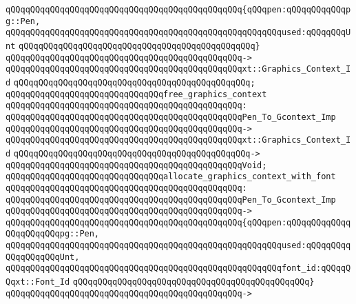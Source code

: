 \verb|qQQqqQQqqQQqqQQqqQQqqQQqqQQqqQQqqQQqqQQqqQQqqQQq{qQQqpen:qQQqqQQqqQQqpg::Pen,|\newline
\verb|qQQqqQQqqQQqqQQqqQQqqQQqqQQqqQQqqQQqqQQqqQQqqQQqqQQqqQQqused:qQQqqQQqUnt|\newline
\verb|qQQqqQQqqQQqqQQqqQQqqQQqqQQqqQQqqQQqqQQqqQQqqQQq}|\newline
\verb|qQQqqQQqqQQqqQQqqQQqqQQqqQQqqQQqqQQqqQQqqQQqqQQq->|\newline
\verb|qQQqqQQqqQQqqQQqqQQqqQQqqQQqqQQqqQQqqQQqqQQqqQQqxt::Graphics_Context_Id|\newline
\verb|qQQqqQQqqQQqqQQqqQQqqQQqqQQqqQQqqQQqqQQqqQQqqQQq;|\newline
\newline
\verb|qQQqqQQqqQQqqQQqqQQqqQQqqQQqqQQqfree_graphics_context|\newline
\verb|qQQqqQQqqQQqqQQqqQQqqQQqqQQqqQQqqQQqqQQqqQQqqQQq:|\newline
\verb|qQQqqQQqqQQqqQQqqQQqqQQqqQQqqQQqqQQqqQQqqQQqqQQqPen_To_Gcontext_Imp|\newline
\verb|qQQqqQQqqQQqqQQqqQQqqQQqqQQqqQQqqQQqqQQqqQQqqQQq->|\newline
\verb|qQQqqQQqqQQqqQQqqQQqqQQqqQQqqQQqqQQqqQQqqQQqqQQqxt::Graphics_Context_Id|\newline
\verb|qQQqqQQqqQQqqQQqqQQqqQQqqQQqqQQqqQQqqQQqqQQqqQQq->|\newline
\verb|qQQqqQQqqQQqqQQqqQQqqQQqqQQqqQQqqQQqqQQqqQQqqQQqVoid;|\newline
\newline
\verb|qQQqqQQqqQQqqQQqqQQqqQQqqQQqqQQqallocate_graphics_context_with_font|\newline
\verb|qQQqqQQqqQQqqQQqqQQqqQQqqQQqqQQqqQQqqQQqqQQqqQQq:|\newline
\verb|qQQqqQQqqQQqqQQqqQQqqQQqqQQqqQQqqQQqqQQqqQQqqQQqPen_To_Gcontext_Imp|\newline
\verb|qQQqqQQqqQQqqQQqqQQqqQQqqQQqqQQqqQQqqQQqqQQqqQQq->|\newline
\verb|qQQqqQQqqQQqqQQqqQQqqQQqqQQqqQQqqQQqqQQqqQQqqQQq{qQQqpen:qQQqqQQqqQQqqQQqqQQqqQQqpg::Pen,|\newline
\verb|qQQqqQQqqQQqqQQqqQQqqQQqqQQqqQQqqQQqqQQqqQQqqQQqqQQqqQQqused:qQQqqQQqqQQqqQQqqQQqUnt,|\newline
\verb|qQQqqQQqqQQqqQQqqQQqqQQqqQQqqQQqqQQqqQQqqQQqqQQqqQQqqQQqfont_id:qQQqqQQqxt::Font_Id|\newline
\verb|qQQqqQQqqQQqqQQqqQQqqQQqqQQqqQQqqQQqqQQqqQQqqQQq}|\newline
\verb|qQQqqQQqqQQqqQQqqQQqqQQqqQQqqQQqqQQqqQQqqQQqqQQq->|\newline
